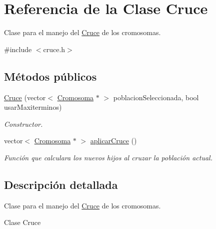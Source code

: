 \hypertarget{classCruce}{\section{Referencia de la Clase Cruce}
\label{classCruce}
}


Clase para el manejo del \hyperlink{classCruce}{Cruce} de los cromosomas.  




{\ttfamily \#include $<$cruce.\-h$>$}

\subsection*{Métodos públicos}
\begin{DoxyCompactItemize}
\item 
\hyperlink{classCruce_a788886895f352f0e54fe4a08db9d27a1}{Cruce} (vector$<$ \hyperlink{classCromosoma}{Cromosoma} $\ast$ $>$ poblacion\-Seleccionada, bool usar\-Maxiterminos)
\begin{DoxyCompactList}\small\item\em Constructor. \end{DoxyCompactList}\item 
vector$<$ \hyperlink{classCromosoma}{Cromosoma} $\ast$ $>$ \hyperlink{classCruce_a5fd9d9cbca36abf7d81f5eedc06f18e7}{aplicar\-Cruce} ()
\begin{DoxyCompactList}\small\item\em Función que calculara los nuevos hijos al cruzar la población actual. \end{DoxyCompactList}\end{DoxyCompactItemize}


\subsection{Descripción detallada}
Clase para el manejo del \hyperlink{classCruce}{Cruce} de los cromosomas. 

\begin{DoxyVerb}Clase Cruce
\end{DoxyVerb}



